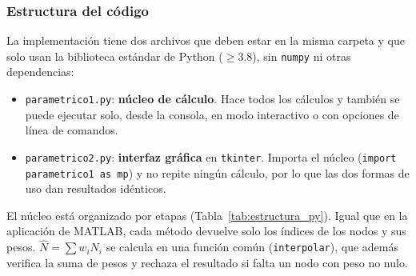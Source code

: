 \documentclass[11pt,letterpaper]{article}
\begin{document}
\subsubsection{Estructura del código}
La implementación tiene dos archivos que deben estar en la misma carpeta y que solo usan la
biblioteca estándar de Python ($\geq 3.8$), sin \texttt{numpy} ni otras dependencias:
\begin{itemize}
    \item \texttt{parametrico1.py}: \textbf{núcleo de cálculo}. Hace todos los cálculos y
    también se puede ejecutar solo, desde la consola, en modo interactivo o con opciones de
    línea de comandos.
    \item \texttt{parametrico2.py}: \textbf{interfaz gráfica} en \texttt{tkinter}. Importa el
    núcleo (\texttt{import parametrico1 as mp}) y no repite ningún cálculo, por lo que las dos
    formas de uso dan resultados idénticos.
\end{itemize}
El núcleo está organizado por etapas (Tabla~\ref{tab:estructura_py}). Igual que en la
aplicación de MATLAB, cada método devuelve solo los índices de los nodos y sus pesos.
$\hat N=\sum w_iN_i$ se calcula en una función común (\texttt{interpolar}), que además
verifica la suma de pesos y rechaza el resultado si falta un nodo con peso no nulo.
\end{document}
